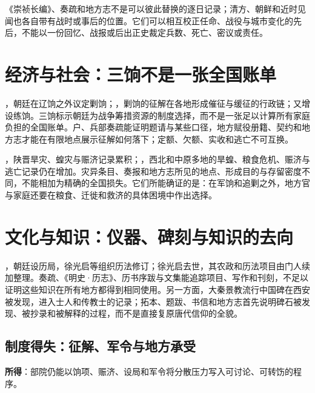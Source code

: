 \begin{debate}
《崇祯长编》、奏疏和地方志不是可以彼此替换的逐日记录；清方、朝鲜和近时见闻也各自带有战时或事后的位置。它们可以相互校正任命、战役与城市变化的先后，不能以一份回忆、战报或后出正史裁定兵数、死亡、密议或责任。
\end{debate}




\section{经济与社会：三饷不是一张全国账单}

，朝廷在辽饷之外议定剿饷；，剿饷的征解在各地形成催征与缓征的行政链；又增设练饷。三饷标示朝廷为战争筹措资源的制度选择，而不是一张足以计算所有家庭负担的全国账单。户、兵部奏疏能证明题请与某些口径，地方赋役册籍、契约和地方志才能在有限地点展示征解如何落下；定额、欠额、实收和逃亡不可互换。

，陕晋旱灾、蝗灾与赈济记录累积；，西北和中原多地的旱蝗、粮食危机、赈济与逃亡记录仍在增加。灾异条目、奏报和地方志所见的地点、形成目的与存留密度不同，不能相加为精确的全国损失。它们所能确证的是：在军饷和追剿之外，地方官与家庭还要在粮食、迁徙和救济的具体困境中作出选择。

\section{文化与知识：仪器、碑刻与知识的去向}

，朝廷设历局，徐光启等组织历法修订；徐光启去世，其农政和历法项目由门人续加整理。奏疏、《明史·历志》、历书序跋与文集能追踪项目、写作和刊刻，不足以证明这些知识在所有地方都得到相同使用。另一方面，大秦景教流行中国碑在西安被发现，进入士人和传教士的记录；拓本、题跋、书信和地方志首先说明碑石被发现、被抄录和被解释的过程，而不是直接复原唐代信仰的全貌。

\subsection{制度得失：征解、军令与地方承受}
\textbf{所得}：部院仍能以饷项、赈济、设局和军令将分散压力写入可讨论、可转饬的程序。

